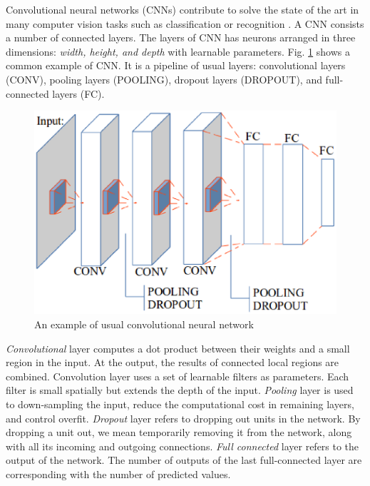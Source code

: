 \documentclass[conference]{IEEEtran}
\begin{document}
Convolutional neural networks (CNNs) contribute to solve the state of the art in many computer vision tasks such as classification \cite{krizhevsky2012imagenet}\cite{ciregan2012multi} or recognition \cite{li2015convolutional}\cite{tompson2014joint}. A CNN consists a number of connected layers. The layers of CNN has neurons arranged in three dimensions: \textit{width, height, and depth} with learnable parameters. Fig. \ref{figconvarc} shows a common example of CNN. It is a pipeline of usual layers: convolutional layers (CONV), pooling layers (POOLING), dropout layers (DROPOUT), and full-connected layers (FC).
\begin{figure}[htbp]
	\centerline{\includegraphics[scale=0.45]{images/convarc.eps}}
	\caption{An example of usual convolutional neural network}
	\label{figconvarc}
\end{figure}

\textit{Convolutional} layer computes a dot product between their weights and a small region in the input. At the output, the results of connected local regions are combined. Convolution layer uses a set of learnable filters as parameters. Each filter is small spatially but extends the depth of the input. \textit{Pooling} layer is used to down-sampling the input, reduce the computational cost in remaining layers, and control overfit. \textit{Dropout} layer refers to dropping out units in the network. By dropping a unit out, we mean temporarily removing it from the network, along with all its incoming and outgoing connections. \textit{Full connected} layer refers to the output of the network. The number of outputs of the last full-connected layer are corresponding with the number of predicted values.
\end{document}
